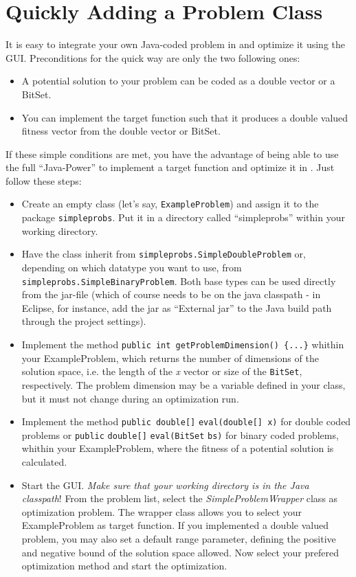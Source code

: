\chapter{Quickly Adding a Problem Class\label{sec:Quickly-Adding-Your-Problem}}

It is easy to integrate your own Java-coded problem in 
and optimize it using the GUI. Preconditions for the quick way are
only the two following ones:
\begin{itemize}
\item A potential solution to your problem can be coded as a double vector
or a BitSet.
\item You can implement the target function such that it produces a double
valued fitness vector from the double vector or BitSet.
\end{itemize}
If these simple conditions are met, you have the advantage of being
able to use the full ``Java-Power'' to implement a target function
and optimize it in . Just follow these steps:
\begin{itemize}
\item Create an empty class (let's say, \texttt{ExampleProblem}) and assign
it to the package \texttt{simpleprobs}. Put it in a directory called
``simpleprobs'' within your working directory.
\item Have the class inherit from \texttt{simpleprobs.SimpleDoubleProblem}
or, depending on which datatype you want to use, from \texttt{simple\-probs.Simple\-Binary\-Problem}.
Both base types can be used directly from the  jar-file
(which of course needs to be on the java classpath - in Eclipse, for
instance, add the  jar as ``External jar'' to the Java
build path through the project settings).
\item Implement the method \texttt{public int getProblemDimension() \{...\}}
whithin your ExampleProblem, which returns the number of dimensions
of the solution space, i.e. the length of the \emph{x} vector or size
of the \texttt{BitSet}, respectively. The problem dimension may be
a variable defined in your class, but it must not change during an
optimization run.
\item Implement the method \texttt{public double{[}{]}} \texttt{eval(double{[}{]}
x)} for double coded problems or \texttt{public} \texttt{double{[}{]}}
\texttt{eval(BitSet} \texttt{bs)} for binary coded problems, whithin
your ExampleProblem, where the fitness of a potential solution is
calculated.
\item Start the  GUI. \emph{Make sure that your working directory
is in the Java classpath}! From the problem list, select the \emph{SimpleProblemWrapper}
class as optimization problem. The wrapper class allows you to select
your ExampleProblem as target function. If you implemented a double
valued problem, you may also set a default range parameter, defining
the positive and negative bound of the solution space allowed. Now
select your prefered optimization method and start the optimization.
\end{itemize}